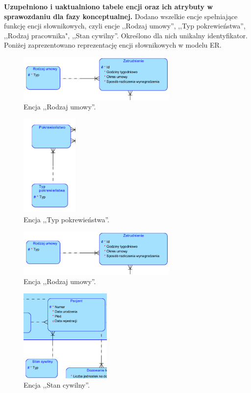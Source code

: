 \clearpage

\textbf{Uzupełniono i uaktualniono tabele encji oraz ich atrybuty w sprawozdaniu dla fazy konceptualnej.} Dodano wszelkie encje spełniające funkcję encji słownikowych, czyli encje ,,Rodzaj umowy'', ,,Typ pokrewieństwa'', ,,Rodzaj pracownika", ,,Stan cywilny''. Określono dla nich unikalny identyfikator. Poniżej zaprezentowano reprezentację encji słownikowych w modelu ER.

\begin{figure}[H]
\centering
\includegraphics[width=0.7\textwidth]{img/rodzaj_umowy.png}
\caption{\small Encja ,,Rodzaj umowy''.}
\end{figure}

\begin{figure}[H]
\centering
\includegraphics[width=0.25\textwidth]{img/typ_pokrewienstwa.png}
\caption{\small Encja ,,Typ pokrewieństwa''.}
\end{figure}

\begin{figure}[H]
\centering
\includegraphics[width=0.7\textwidth]{img/rodzaj_umowy.png}
\caption{\small Encja ,,Rodzaj umowy''.}
\end{figure}

\begin{figure}[H]
\centering
\includegraphics[width=0.4\textwidth]{img/stan_cywilny.png}
\caption{\small Encja ,,Stan cywilny''.}
\end{figure}



